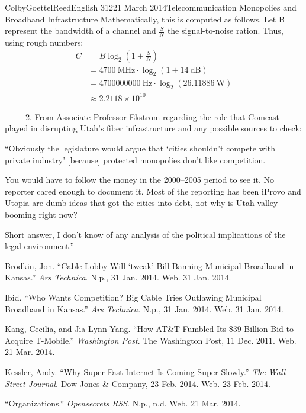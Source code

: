 \documentclass[12pt]{article}
\begin{document}
\begin{mla}{Colby}{Goettel}{Reed}{English 312}{21 March 2014}{Telecommunication Monopolies and Broadband Infrastructure}
Mathematically, this is computed as follows. Let B represent the bandwidth of a channel and $\frac{S}{N}$ the signal-to-noise ration. Thus, using rough numbers:
\begin{align*}
    C&=B\log_2\left(1+\frac{S}{N}\right) \\
     &=4700~\text{MHz}\cdot\log_2\left(1+14~\text{dB}\right) \\
     &=4700000000~\text{Hz}\cdot\log_2(26.11886~\text{W}) \\
     &\approx2.2118\times10^{10}
\end{align*}

{\noindent\ \ \ \ \ 2. From Associate Professor Ekstrom regarding the role that Comcast played in disrupting Utah's fiber infrastructure and any possible sources to check:}
\begin{mlaquote}
    ``Obviously the legislature would argue that `cities shouldn't compete with private industry' [because] protected monopolies don't like competition.

    You would have to follow the money in the 2000--2005 period to see it. No reporter cared enough to document it. Most of the reporting has been iProvo and Utopia are dumb ideas that got the cities into debt, not why is Utah valley booming right now?

    Short answer, I don't know of any analysis of the political implications of the legal environment.''
\end{mlaquote}

\begin{workscited}
    \bibent Brodkin, Jon. ``Cable Lobby Will `tweak' Bill Banning Municipal Broadband in Kansas.'' \textit{Ars Technica}. N.p., 31 Jan. 2014. Web. 31 Jan. 2014.
    
    \bibent Ibid. ``Who Wants Competition? Big Cable Tries Outlawing Municipal Broadband in Kansas.'' \textit{Ars Technica}. N.p., 31 Jan. 2014. Web. 31 Jan. 2014.
    
    \bibent Kang, Cecilia, and Jia Lynn Yang. ``How AT\&T Fumbled Its \$39 Billion Bid to Acquire T-Mobile.'' \textit{Washington Post}. The Washington Post, 11 Dec. 2011. Web. 21 Mar. 2014.
    
    \bibent Kessler, Andy. ``Why Super-Fast Internet Is Coming Super Slowly.'' \textit{The Wall Street Journal}. Dow Jones \& Company, 23 Feb. 2014. Web. 23 Feb. 2014.
    
    \bibent ``Organizations.'' \textit{Opensecrets RSS}. N.p., n.d. Web. 21 Mar. 2014.
    

\end{workscited}
\end{mla}
\end{document}
